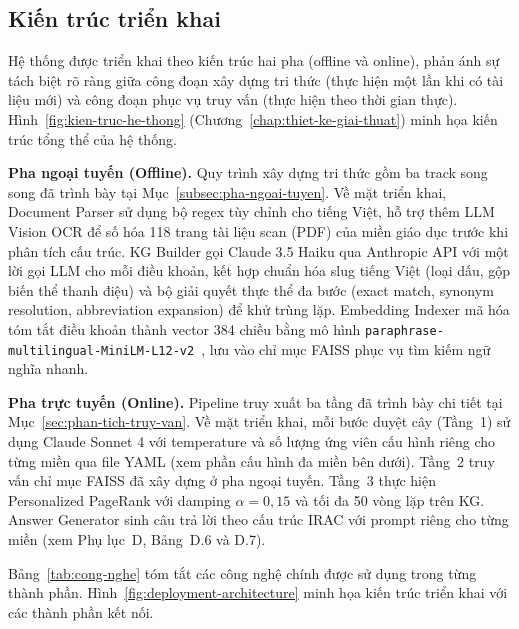 \subsection{Kiến trúc triển khai}
\label{subsec:kien-truc-trien-khai}

Hệ thống được triển khai theo kiến trúc hai pha (offline và online), phản ánh sự
tách biệt rõ ràng giữa công đoạn xây dựng tri thức (thực hiện một lần khi có tài liệu
mới) và công đoạn phục vụ truy vấn (thực hiện theo thời gian thực). Hình~\ref{fig:kien-truc-he-thong}
(Chương~\ref{chap:thiet-ke-giai-thuat}) minh họa kiến trúc tổng thể của hệ thống.

\textbf{Pha ngoại tuyến (Offline).} Quy trình xây dựng tri thức gồm ba track song
song đã trình bày tại Mục~\ref{subsec:pha-ngoai-tuyen}. Về mặt triển khai, Document
Parser sử dụng bộ regex tùy chỉnh cho tiếng Việt, hỗ trợ thêm LLM Vision OCR để số
hóa 118 trang tài liệu scan (PDF) của miền giáo dục trước khi phân tích cấu trúc. KG
Builder gọi Claude 3.5 Haiku qua Anthropic API với một lời gọi LLM cho mỗi điều
khoản, kết hợp chuẩn hóa slug tiếng Việt (loại dấu, gộp biến thể thanh điệu) và bộ
giải quyết thực thể đa bước (exact match, synonym resolution, abbreviation expansion)
để khử trùng lặp. Embedding Indexer mã hóa tóm tắt điều khoản thành vector 384 chiều
bằng mô hình \texttt{paraphrase-multilingual-MiniLM-L12-v2}~\cite{reimers2019sbert},
lưu vào chỉ mục FAISS phục vụ tìm kiếm ngữ nghĩa nhanh.

\textbf{Pha trực tuyến (Online).} Pipeline truy xuất ba tầng đã trình bày chi tiết
tại Mục~\ref{sec:phan-tich-truy-van}. Về mặt triển khai, mỗi bước duyệt cây (Tầng~1)
sử dụng Claude Sonnet 4 với temperature và số lượng ứng viên cấu hình riêng cho từng
miền qua file YAML (xem phần cấu hình đa miền bên dưới). Tầng~2 truy vấn chỉ mục
FAISS đã xây dựng ở pha ngoại tuyến. Tầng~3 thực hiện Personalized PageRank với
damping $\alpha = 0{,}15$ và tối đa 50 vòng lặp trên KG. Answer Generator sinh câu trả
lời theo cấu trúc IRAC với prompt riêng cho từng miền (xem Phụ lục~D,
Bảng~D.6 và D.7).

Bảng~\ref{tab:cong-nghe} tóm tắt các công nghệ chính được sử dụng trong từng thành
phần. Hình~\ref{fig:deployment-architecture} minh họa kiến trúc triển khai với các
thành phần kết nối.

